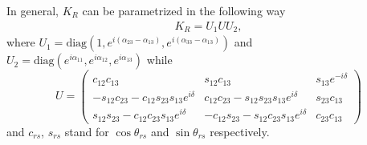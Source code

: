 \documentclass[twocolumn,superscriptaddress,showpacs,prl,nofootinbib,floatfix]{revtex4}
\def\beqa{\begin{eqnarray}}
\def\eeqa{\end{eqnarray}}
\begin{document}
In general, $K_R$ can be parametrized \cite{Agashe:2014kda}
in the following way
\beqa\label{KR}
K_{R}=U_1UU_2, 
\eeqa
where $U_1=\mathrm{diag}(1,e^{i(\alpha_{23}-\alpha_{13})},e^{i(\alpha_{33}-\alpha_{13})})$ 
and \\
$U_2=\mathrm{diag}(e^{i\alpha_{11}},e^{i\alpha_{12}},e^{i\alpha_{13}})$ while
\begin{equation}
U=\left(
\begin{array}{ccc}
c_{12}c_{13}&s_{12}c_{13}&s_{13}e^{-i\delta}\\
-s_{12}c_{23}-c_{12}s_{23}s_{13}e^{i\delta}&c_{12}c_{23}-s_{12}s_{23}s_{13}e^{i\delta}&s_{23}c_{13}\\
s_{12}s_{23}-c_{12}c_{23}s_{13}e^{i\delta}&-c_{12}s_{23}-s_{12}c_{23}s_{13}e^{i\delta}&c_{23}c_{13}
\end{array}
\right) \label{3times3}
\end{equation}
and $c_{rs}$, $s_{rs}$ stand for $\cos\theta_{rs}$ and $\sin\theta_{rs}$ respectively. 


\providecommand{\href}[2]{#2}
%

\end{document}
